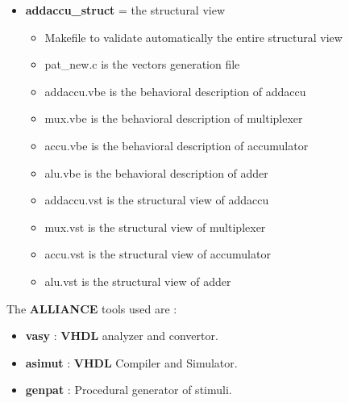 \documentclass[12pt]{article}
\begin{document}
{\begin{itemize}
\begin{itemize}
\item Makefile to validate automatically the entire behavioral description
\item addaccu.vbe is the behavioral description of addaccu
\item patterns.pat is the simulation patterns for addaccu
\item addaccu\_dly.vbe is the behavioral description of addaccu with delay
\item patterns\_dly.pat is the simulation patterns for addaccu with delay
\item addaccu4.vhdl is the behavioral description of addaccu using standard VHDL subset
\end{itemize}

\item {\bf addaccu\_struct} = the structural view 

\begin{itemize}
\item Makefile to validate automatically the entire structural view
\item pat\_new.c is the vectors generation file
\item addaccu.vbe is the behavioral description of addaccu
\item mux.vbe is the behavioral description of multiplexer
\item accu.vbe is the behavioral description of accumulator
\item alu.vbe is the behavioral description of adder
\item addaccu.vst is the structural view of addaccu
\item mux.vst is the structural view of multiplexer
\item accu.vst is the structural view of accumulator
\item alu.vst is the structural view of adder
\end{itemize}

\end{itemize}

The {\bf ALLIANCE} tools used are :
\begin{itemize}\itemsep=-.8ex
\item {\bf vasy} : {\bf VHDL} analyzer and convertor.
\item {\bf asimut} : {\bf VHDL} Compiler and Simulator.
\item{\bf genpat} :    Procedural generator of stimuli.
\end{itemize}

}
\end{document}
